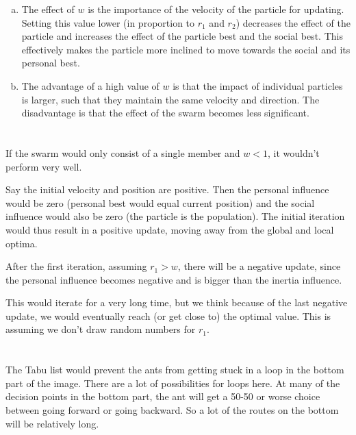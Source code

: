 \documentclass[11pt]{article}
\begin{document}
\begin{enumerate}[(a)]
\item The effect of $w$ is the importance of the velocity of the particle for updating. Setting this value lower (in proportion to $r_1$ and $r_2$) decreases the effect of the particle and increases the effect of the particle best and the social best. This effectively makes the particle more inclined to move towards the social and its personal best.

\item The advantage of a high value of $w$ is that the impact of individual particles is larger, such that they maintain the same velocity and direction. The disadvantage is that the effect of the swarm becomes less significant.
\end{enumerate}


\section{}
If the swarm would only consist of a single member and $w < 1$, it wouldn't perform very well. 

Say the initial velocity and position are positive. Then the personal influence would be zero (personal best would equal current position) and the social influence would also be zero (the particle is the population). The initial iteration would thus result in a positive update, moving away from the global and local optima. 

After the first iteration, assuming $r_1 > w$, there will be a negative update, since the personal influence becomes negative and is bigger than the inertia influence.

This would iterate for a very long time, but we think because of the last negative update, we would eventually reach (or get close to) the optimal value. This is assuming we don't draw random numbers for $r_1$.

\section{}

\section{}

The Tabu list  would prevent the ants from getting stuck in a loop in the bottom part of the image. There are a lot of possibilities for loops here. At many of the decision points in the bottom part, the ant will get a 50-50 or worse choice between going forward or going backward. So a lot of the routes on the bottom will be relatively long.
\end{document}
